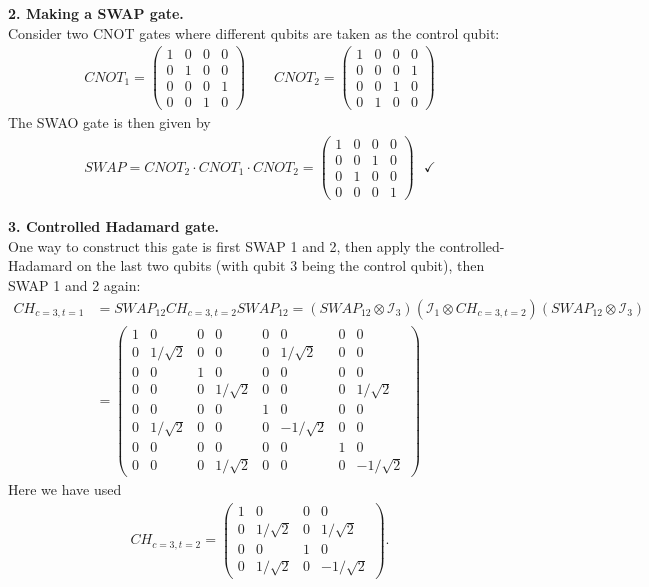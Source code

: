\documentclass{article}
\theoremstyle{definition}
\newcommand{\Id}{\mathcal{I}}
\begin{document}
\noindent \textbf{2. Making a SWAP gate.}\\

\noindent Consider two CNOT gates where different qubits are taken as the control qubit:
\begin{align*}
	CNOT_{1} = \begin{pmatrix}
		1 & 0 & 0 & 0 \\
		0 & 1 & 0 & 0 \\
		0 & 0 & 0 & 1 \\
		0 & 0 & 1 & 0
	\end{pmatrix} \quad\quad 
	CNOT_{2} = \begin{pmatrix}
		1 & 0 & 0 & 0 \\
		0 & 0 & 0 & 1 \\
		0 & 0 & 1 & 0 \\
		0 & 1 & 0 & 0 
	\end{pmatrix}
\end{align*}
The SWAO gate is then given by 
\begin{align*}
	SWAP = CNOT_2 \cdot  CNOT_1 \cdot  CNOT_2 = \begin{pmatrix}
		1 & 0 & 0 & 0 \\
		0 & 0 & 1 & 0 \\
		0 & 1 & 0 & 0 \\
		0 & 0 & 0 & 1
	\end{pmatrix} \,\,\,\, \checkmark
\end{align*}


\noindent \textbf{3. Controlled Hadamard gate.}\\

\noindent One way to construct this gate is first SWAP 1 and 2, then apply the controlled-Hadamard on the last two qubits (with qubit 3 being the control qubit), then SWAP 1 and 2 again:
\begin{align*}
	CH_{c=3,t=1} &= SWAP_{12} CH_{c=3,t=2} SWAP_{12} = (SWAP_{12}\otimes \Id_3) (\Id_1\otimes CH_{c=3,t=2} ) (SWAP_{12}\otimes \Id_3)\\
	&= \begin{pmatrix}
		1 &0&0&0&0&0&0&0 \\
		0& 1/\sqrt{2}&0&0&0&1/\sqrt{2}&0&0 \\
		0&0&1&0&0&0&0&0 \\
		0&0&0&1/\sqrt{2}&0&0&0&1/\sqrt{2} \\ 
		0&0&0&0&1&0&0&0 \\
		0&1/\sqrt{2}&0&0&0&-1/\sqrt{2}&0&0 \\
		0&0&0&0&0&0&1&0 \\
		0&0&0&1/\sqrt{2}&0&0&0&-1/\sqrt{2} 
	\end{pmatrix}
\end{align*}
Here we have used 
\begin{align*}
	CH_{c=3,t=2} = \begin{pmatrix}
		1 & 0 & 0 & 0 \\
		0 & 1/\sqrt{2} & 0 & 1/\sqrt{2} \\
		0 & 0 & 1 & 0 \\
		0 & 1/\sqrt{2} & 0 & -1/\sqrt{2}
	\end{pmatrix}.
\end{align*}
\end{document}
